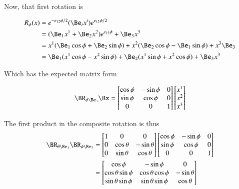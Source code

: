 \documentclass{article}
\begin{document}
Now, that first rotation is

\begin{align*}
R_\phi(x)
&= e^{-e_{12}\phi/2} (\Be_i x^i) e^{e_{12}\phi/2} \\
&= ( \Be_1 x^1 +\Be_2 x^2) e^{e_{12}\phi} + \Be_3 x^3 \\
&= 
 x^1 ( \Be_1 \cos\phi +\Be_2 \sin\phi )
+x^2 ( \Be_2 \cos\phi -\Be_1 \sin\phi )
+x^3 \Be_3 \\
&= 
 \Be_1 ( x^1 \cos\phi - x^2 \sin\phi )
+\Be_2 ( x^1 \sin\phi + x^2 \cos\phi )
+\Be_3 x^3 \\
\end{align*}

Which has the expected matrix form

\begin{align*}
\BR_{\phi \Be_3} \Bx =
\begin{bmatrix}
\cos\phi & - \sin\phi & 0 \\
\sin\phi & \cos\phi & 0 \\
0 & 0 & 1 \\
\end{bmatrix}
\begin{bmatrix}
x^1 \\
x^2 \\
x^3 \\
\end{bmatrix}
\end{align*}

The first product in the composite rotation is thus
\begin{align*}
\BR_{\theta \Be_1} \BR_{\phi \Be_3} &=
\begin{bmatrix}
1 & 0 & 0 \\
0 & \cos\theta & - \sin\theta \\
0 & \sin\theta & \cos\theta \\
\end{bmatrix} 
\begin{bmatrix}
\cos\phi & - \sin\phi & 0 \\
\sin\phi & \cos\phi & 0 \\
0 & 0 & 1 \\
\end{bmatrix} \\
&=
\begin{bmatrix}
\cos\phi             & -\sin\phi             & 0 \\
\cos\theta\sin\phi   & \cos\theta\cos\phi    & -\sin\theta \\
\sin\theta\sin\phi   & \sin\theta\sin\phi    & \cos\theta \\
\end{bmatrix} \\
\end{align*}
\end{document}
